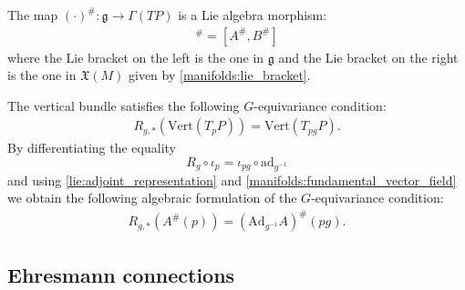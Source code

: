 
    \begin{property}
        The map $(\cdot)^\#:\mathfrak{g}\rightarrow\Gamma(TP)$ is a Lie algebra morphism:
        \begin{gather}
            [A, B]^\# = [A^\#, B^\#]
        \end{gather}
        where the Lie bracket on the left is the one in $\mathfrak{g}$ and the Lie bracket on the right is the one in $\mathfrak{X}(M)$ given by \ref{manifolds:lie_bracket}.
    \end{property}

    \begin{property}
        The vertical bundle satisfies the following $G$-equivariance condition:
        \begin{gather}
            \label{diff:vert_g_equivariance}
            R_{g, \ast}(\text{Vert}(T_pP)) = \text{Vert}(T_{pg}P).
        \end{gather}
        By differentiating the equality \[R_g\circ\iota_p = \iota_{pg}\circ\text{ad}_{g^{-1}}\] and using \ref{lie:adjoint_representation} and \ref{manifolds:fundamental_vector_field} we obtain the following algebraic formulation of the $G$-equivariance condition:
        \begin{gather}
            R_{g, \ast}\left(A^\#(p)\right) = \left(\text{Ad}_{g^{-1}}A\right)^\#(pg).
        \end{gather}
    \end{property}

\subsection{Ehresmann connections}

